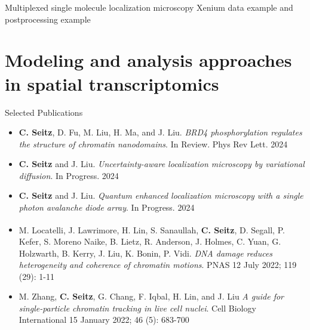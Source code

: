 \documentclass{beamer}					%
\begin{document}
\begin{frame}{Multiplexed single molecule localization microscopy}
Xenium data example and postprocessing example
\end{frame}



\section{Modeling and analysis approaches in spatial transcriptomics}


\begin{frame}{Selected Publications}

\begin{itemize}

\item \textbf{C. Seitz}, D. Fu, M. Liu, H. Ma, and J. Liu. \textit{BRD4 phosphorylation regulates the structure of chromatin nanodomains}. In Review. Phys Rev Lett. 2024

\item \textbf{C. Seitz} and J. Liu. \textit{Uncertainty-aware localization microscopy by variational diffusion}. In Progress. 2024

\item \textbf{C. Seitz} and J. Liu. \textit{Quantum enhanced localization microscopy with a single photon avalanche diode array}. In Progress. 2024

\item M. Locatelli\textsuperscript{\textdagger}, J. Lawrimore\textsuperscript{\textdagger}, H. Lin\textsuperscript{\textdagger}, S. Sanaullah, \textbf{C. Seitz}, D. Segall, P. Kefer, S. Moreno Naike, B. Lietz, R. Anderson, J. Holmes, C. Yuan, G. Holzwarth, B. Kerry, J. Liu, K. Bonin, P. Vidi. \textit{DNA damage reduces heterogeneity and coherence of chromatin motions}. PNAS 12 July 2022; 119 (29): 1-11

\item M. Zhang, \textbf{C. Seitz}, G. Chang, F. Iqbal, H. Lin, and J. Liu \textit{A guide for single-particle chromatin tracking in live cell nuclei}. Cell Biology International 15 January 2022; 46 (5): 683-700


\end{itemize}
\end{frame}
\end{document}
